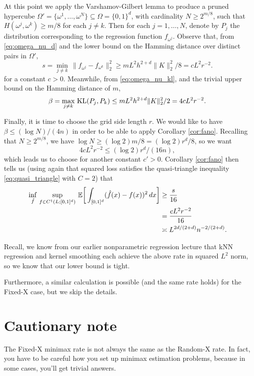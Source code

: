 \documentclass{article}
\begin{document}
At this point we apply the Varshamov-Gilbert lemma to produce a pruned hypercube
$\Omega' = \{\omega^1,\dots,\omega^N \} \subseteq \Omega = \{0,1\}^d$, with
cardinality $N \geq 2^{m/8}$, such that $H(\omega^j,\omega^k) \geq m/8$ for each
$j \not= k$. Then for each $j=1,\dots,N$, denote by $P_j$ the distribution
corresponding to the regression function $f_{\omega^j}$. Observe that, from 
\eqref{eq:omega_nu_d} and the lower bound on the Hamming distance over distinct
pairs in $\Omega'$,
\[
s = \min_{j \not= k} \, \| f_{\omega^j} - f_{\omega^k} \|_2^2 
\geq m L^2 h^{2+d} \|K\|_2^2 / 8 = c L^2 r^{-2}. 
\]
for a constant $c>0$. Meanwhile, from \eqref{eq:omega_nu_kl}, and the trivial
upper bound on the Hamming distance of $m$,
\[
\beta = \max_{j \not= k} \, \mathrm{KL}(P_j,P_k) \leq m L^2 h^{2+d} \|K\|_2^2 / 2 
= 4c L^2 r^{-2}.
\]

Finally, it is time to choose the grid side length $r$. We would like to have
$\beta \leq (\log N)/(4n)$ in order to be able to apply Corollary
\ref{cor:fano}. Recalling that $N \geq 2^{m/8}$, we have $\log N \geq (\log 2) m
/ 8 = (\log 2) r^d / 8$, so we want
\[
4c L^2 r^{-2} \leq (\log 2) r^d / (16n),
\]
which leads us to choose  for
another constant $c'>0$. Corollary \ref{cor:fano} then tells us (using again
that squared loss satisfies the quasi-triangle inequality
\eqref{eq:quasi_triangle} with $C=2$) that 
\begin{align*}
\inf_{\hat{f}} \, \sup_{f \in C^1(L; [0,1]^d)} \, \mathbb{E} \bigg[ \int_{[0,1]^d} (\hat{f}(x) -
  f(x))^2 \, dx \bigg] 
&\geq \frac{s}{16} \\
&= \frac{cL^2 r^{-2}}{16} \\
&\asymp L^{2d/(2+d)} n^{-2/(2+d)}.
\end{align*}  

Recall, we know from our earlier nonparametric regression lecture that kNN
regression and kernel smoothing each achieve the above rate in squared $L^2$ 
norm, so we know that our lower bound is tight.  

Furthermore, a similar calculation is possible (and the same rate holds) for the
Fixed-X case, but we skip the details. 

\section{Cautionary note}

The Fixed-X minimax rate is not always the same as the Random-X rate. In fact,
you have to be careful how you set up minimax estimation problems, because in
some cases, you'll get trivial answers. 
\end{document}
